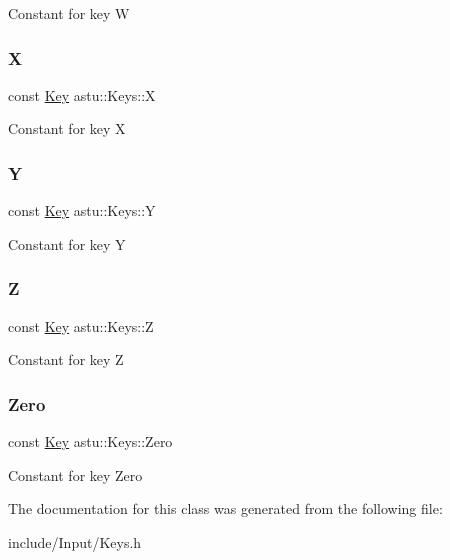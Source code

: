 Constant for key \textquotesingle{}W\textquotesingle{} \mbox{\label{classastu_1_1Keys_a129fdfdceb4fbabd14211436e66e2626}} 
\subsubsection{\texorpdfstring{X}{X}}
{\footnotesize\ttfamily const \hyperlink{classastu_1_1Key}{Key} astu\+::\+Keys\+::X\hspace{0.3cm}{\ttfamily [static]}}

Constant for key \textquotesingle{}X\textquotesingle{} \mbox{\label{classastu_1_1Keys_aa5382a0920b514bc3b24c60dc9bb5781}} 
\subsubsection{\texorpdfstring{Y}{Y}}
{\footnotesize\ttfamily const \hyperlink{classastu_1_1Key}{Key} astu\+::\+Keys\+::Y\hspace{0.3cm}{\ttfamily [static]}}

Constant for key \textquotesingle{}Y\textquotesingle{} \mbox{\label{classastu_1_1Keys_aed45ba369b7ae04a07c26db904722892}} 
\subsubsection{\texorpdfstring{Z}{Z}}
{\footnotesize\ttfamily const \hyperlink{classastu_1_1Key}{Key} astu\+::\+Keys\+::Z\hspace{0.3cm}{\ttfamily [static]}}

Constant for key \textquotesingle{}Z\textquotesingle{} \mbox{\label{classastu_1_1Keys_aa9f390ffc45b3b49db894d46eb187874}} 
\subsubsection{\texorpdfstring{Zero}{Zero}}
{\footnotesize\ttfamily const \hyperlink{classastu_1_1Key}{Key} astu\+::\+Keys\+::\+Zero\hspace{0.3cm}{\ttfamily [static]}}

Constant for key \textquotesingle{}Zero\textquotesingle{} 

The documentation for this class was generated from the following file\+:\begin{DoxyCompactItemize}
\item 
include/\+Input/Keys.\+h\end{DoxyCompactItemize}

